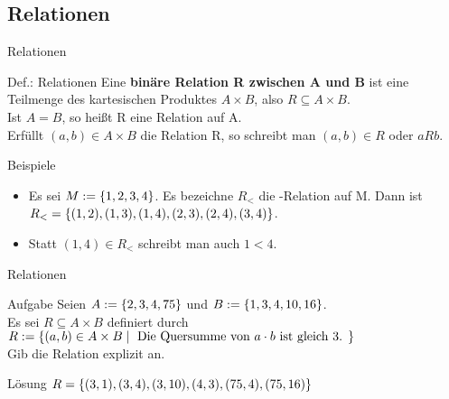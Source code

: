 \subsection{Relationen}
	\begin{frame}{Relationen}
		\begin{block}{Def.: Relationen}
			Eine \textbf{binäre Relation R zwischen A und B} ist eine Teilmenge des kartesischen Produktes $A \times B$, also $R \subseteq A \times B$.\\
			Ist $A=B$, so heißt R eine Relation auf A.\\
			Erfüllt $(a,b) \in A \times B$ die Relation R, so schreibt man $(a,b) \in R$ oder $aRb$.
		\end{block}
	
		\begin{exampleblock}{Beispiele}
			\begin{itemize}
				\item Es sei $M:=\left\{ 1,2,3,4 \right\}$. Es bezeichne $R_<$ die -Relation auf M. Dann ist $R_< = \left\{ (1,2),(1,3),(1,4),(2,3),(2,4),(3,4) \right\}$.
				\item Statt $(1,4) \in R_<$ schreibt man auch $1 < 4$.
			\end{itemize}
		\end{exampleblock}
	\end{frame}

	\begin{frame}{Relationen}
		\begin{exampleblock}{Aufgabe}
			Seien $A:=\left\{ 2,3,4,75 \right\}$ und $B:=\left\{ 1,3,4,10,16 \right\}$.\\ 
			Es sei $R \subseteq A \times B $ definiert durch $R:=\left\{ (a,b) \in A \times B \mid \text{ Die Quersumme von $a \cdot b$ ist gleich 3. } \right\}$\\
			Gib die Relation explizit an.
		\end{exampleblock}
	\pause
		\begin{block}{Lösung}		
			$R=\left\{ (3,1),(3,4),(3,10),(4,3),(75,4),(75,16) \right\}$
		\end{block}
	\end{frame}



